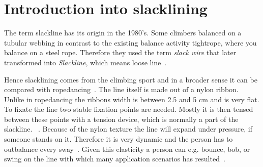 \section{Introduction into slacklining}\label{3_1_introductionSlacklining}
The term slackline has its origin in the 1980's. Some climbers balanced on a tubular webbing in contrast to the existing balance activity tightrope, where you balance on a steel rope. Therefore they used the term \textit{slack wire} that later transformed into \textit{Slackline}, which means loose line~\cite{Zak2011-sl, Balcom2005-wl, MillerMauser2013-sl}.

Hence slacklining comes from the climbing sport and in a broader sense it can be compared with ropedancing~\cite{Kleindl2011-bl}. The line itself is made out of a nylon ribbon. Unlike in ropedancing the ribbons width is between 2.5 and 5 cm and is very flat. To fixate the line two stable fixation points are needed. Mostly it is then tensed between these points with a tension device, which is normally a part of the slackline. ~\cite{Kleindl2011-bl}. Because of the nylon texture the line will expand under pressure, if someone stands on it. Therefore it is very dynamic and the person has to outbalance every sway~\cite{Kroiss2007-ab}. Given this elasticity a person can e.g. bounce, bob, or swing on the line with which many application scenarios has resulted~\cite{Balcom2005-wl}.


